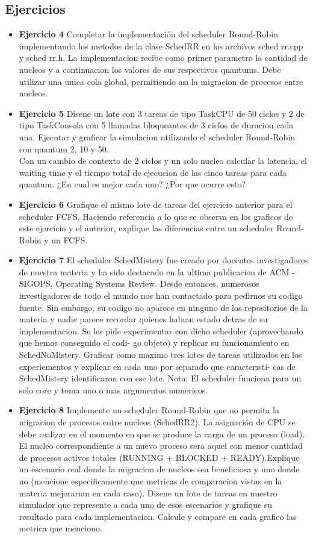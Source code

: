 
\subsection{Ejercicios}
\begin{itemize}
 \item 
\textbf{Ejercicio 4}  Completar la implementación del scheduler Round-Robin implementando los
metodos de la clase SchedRR en los archivos sched rr.cpp y sched rr.h. La implementacion
recibe como primer parametro la cantidad de nucleos y a continuacion los valores de sus
respectivos quantums. Debe utilizar una unica cola global, permitiendo ası la migracion de
procesos entre nucleos.
\item \textbf{Ejercicio 5} Disene un lote con 3 tareas de tipo TaskCPU de 50 ciclos y 2 de tipo TaskConsola
con 5 llamadas bloqueantes de 3 ciclos de duracion cada una. Ejecutar y graficar la simulacion
utilizando el scheduler Round-Robin con quantum 2, 10 y 50.\\
Con un cambio de contexto de 2 ciclos y un solo nucleo calcular la latencia, el waiting
time y el tiempo total de ejecucion de las cinco tareas para cada quantum. 
¿En cual es mejor cada uno? ¿Por que ocurre esto?
\item \textbf{Ejercicio 6} Grafique el mismo lote de tareas del ejercicio anterior para el scheduler FCFS.
Haciendo referencia a lo que se observa en los graficos de este ejercicio y el anterior, explique
las diferencias entre un scheduler Round-Robin y un FCFS.
\item \textbf{Ejercicio 7} El scheduler SchedMistery fue creado por docentes investigadores de nuestra
materia y ha sido destacado en la ultima publicacion de ACM - SIGOPS, Operating Systems
Review. Desde entonces, numerosos investigadores de todo el mundo nos han contactado para
pedirnos su codigo fuente. Sin embargo, su codigo no aparece en ninguno de los repositorios
de la materia y nadie parece recordar quienes habıan estado detras de su implementacion.
Se les pide experimentar con dicho scheduler (aprovechando que hemos conseguido el codi-
go objeto) y replicar su funcionamiento en SchedNoMistery. Graficar como maximo tres lotes
de tareas utilizados en los experiementos y explicar en cada uno por separado que caracterısti-
cas de SchedMistery identificaron con ese lote. Nota: El scheduler funciona para un solo
core y toma uno o mas argumentos numericos.
\item \textbf{Ejercicio 8} Implemente un scheduler Round-Robin que no permita la migracion de procesos
entre nucleos (SchedRR2). La asignación de CPU se debe realizar en el momento en que se produce la carga 
de un proceso (load). El nucleo correspondiente a un nuevo proceso sera aquel
con menor cantidad de procesos activos totales (RUNNING + BLOCKED + READY).Explique un escenario real 
donde la migracion de nucleos sea beneficiosa y uno donde no (mencione
especificamente que metricas de comparacion vistas en la materia mejorarıan en cada caso).
Disene un lote de tareas en nuestro simulador que represente a cada uno de esos escenarios
y grafique su resultado para cada implementacion. Calcule y compare en cada grafico las
metrica que menciono.

\end{itemize}


